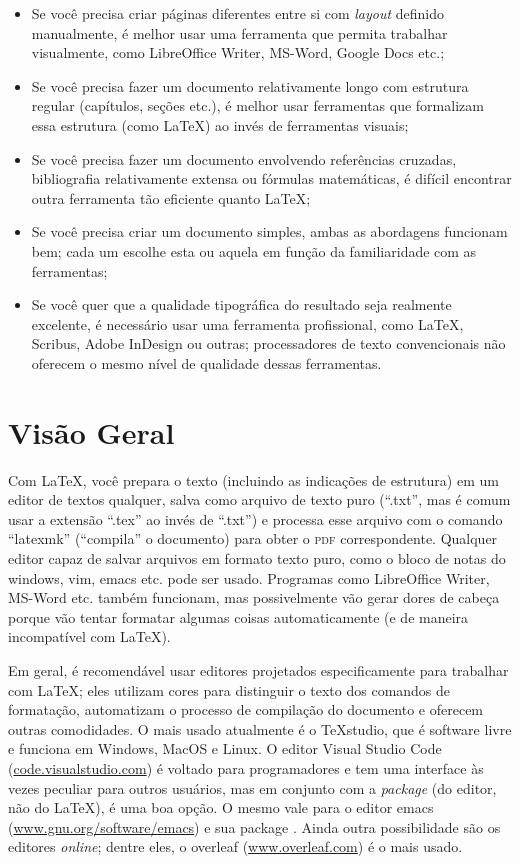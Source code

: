 \begin{itemize}
\item Se você precisa criar páginas diferentes entre si com \emph{layout}
definido manualmente, é melhor usar uma ferramenta que permita trabalhar
visualmente, como LibreOffice Writer, MS-Word, Google Docs etc.;

\item Se você precisa fazer um documento relativamente longo com estrutura
regular (capítulos, seções etc.), é melhor usar ferramentas que formalizam
essa estrutura (como \LaTeX{}) ao invés de ferramentas visuais;

\item Se você precisa fazer um documento envolvendo referências cruzadas,
bibliografia relativamente extensa ou fórmulas matemáticas, é difícil
encontrar outra ferramenta tão eficiente quanto \LaTeX{};

\item Se você precisa criar um documento simples, ambas as abordagens
funcionam bem; cada um escolhe esta ou aquela em função da familiaridade
com as ferramentas;

\item Se você quer que a qualidade tipográfica do resultado seja realmente
excelente, é necessário usar uma ferramenta profissional, como \LaTeX{},
Scribus, Adobe InDesign ou outras; processadores de texto convencionais não
oferecem o mesmo nível de qualidade dessas ferramentas.
\end{itemize}

\section{Visão Geral}

Com \LaTeX{}, você prepara o texto (incluindo as indicações de estrutura) em
um editor de textos qualquer, salva como arquivo de texto puro (``.txt'',
mas é comum usar a extensão ``.tex'' ao invés de ``.txt'') e processa esse
arquivo com o comando ``latexmk'' (``compila'' o documento) para obter o
\textsc{pdf} correspondente. Qualquer editor capaz de salvar arquivos em formato
texto puro, como o bloco de notas do windows, vim, emacs etc. pode ser usado.
Programas como LibreOffice Writer, MS-Word etc. também funcionam, mas
possivelmente vão gerar dores de cabeça porque vão tentar formatar algumas
coisas automaticamente (e de maneira incompatível com \LaTeX{}).

Em geral, é recomendável usar editores projetados especificamente para
trabalhar com \LaTeX{}; eles utilizam cores para distinguir o texto dos
comandos de formatação, automatizam o processo de compilação do documento
e oferecem outras comodidades. O mais usado atualmente é o \TeX{}studio,
que é software livre e funciona em Windows, MacOS e Linux. O editor Visual
Studio Code (\url{code.visualstudio.com}) é voltado para programadores e
tem uma interface às vezes peculiar para outros usuários, mas em conjunto
com a \emph{package}  (do editor, não do \LaTeX), é uma
boa opção. O mesmo vale para o editor emacs (\url{www.gnu.org/software/emacs})
e sua package . Ainda outra possibilidade são os editores
\emph{online}; dentre eles, o overleaf (\url{www.overleaf.com}) é o mais usado.

